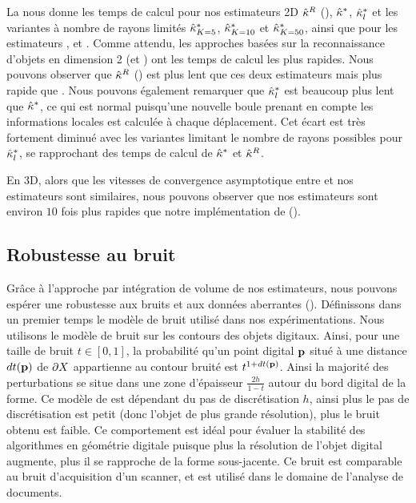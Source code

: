 La  nous donne les temps de calcul pour
nos estimateurs 2D $\hat{\kappa}^{R}$ (\II), $\hat{\kappa}^{*}$, $\hat{\kappa}^{*}_{l}$ et les variantes à
nombre de rayons limités $\hat{\kappa}^{*}_{K=5}$, $\hat{\kappa}^{*}_{K=10}$ et $\hat{\kappa}^{*}_{K=50}$,
ainsi que pour les estimateurs \BC, \MDSS et \MDCA. Comme attendu, les approches
basées sur la reconnaissance d'objets en dimension 2 (\MDSS et \MDCA) ont les
temps de calcul les plus rapides. Nous pouvons observer que $\hat{\kappa}^{R}$ (\II) est
plus lent que ces deux estimateurs mais plus rapide que \BC. Nous pouvons
également remarquer que $\hat{\kappa}^{*}_{l}$ est beaucoup plus lent que $\hat{\kappa}^{*}$, ce qui
est normal puisqu'une nouvelle boule prenant en compte les informations locales
est calculée à chaque déplacement. Cet écart est très fortement diminué avec les
variantes limitant le nombre de rayons possibles pour $\hat{\kappa}^{*}_{l}$, se rapprochant
des temps de calcul de $\hat{\kappa}^{*}$ et $\hat{\kappa}^{R}$.


En 3D, alors que les vitesses de convergence asymptotique entre \JetFitting et
nos estimateurs sont similaires, nous pouvons observer que nos estimateurs sont
environ $10$ fois plus rapides que notre implémentation de \JetFitting (\CGal \cite{CGal}).

\subsection{Robustesse au bruit}
\label{sec:kanungo-noise}

Grâce à l'approche par intégration de volume de nos estimateurs, nous pouvons
espérer une robustesse aux bruits et aux données aberrantes ().
Définissons dans un premier temps le modèle de bruit utilisé dans nos
expérimentations. Nous utilisons le modèle de bruit \Kanungo \cite{Kanungo1996}
sur les contours des objets digitaux. Ainsi, pour une taille de bruit $t \in
[0,1]$, la probabilité qu'un point digital $\mathbf{p}$ situé à une distance $dt(\mathbf{p})$
de $\partial X$ appartienne au contour bruité est $t^{1+dt(\mathbf{p})}$. Ainsi la majorité
des perturbations se situe dans une zone d'épaisseur $\frac{2h}{1-t}$ autour du
bord digital de la forme. Ce modèle de \Kanungo est dépendant du pas de
discrétisation $h$, ainsi plus le pas de discrétisation est petit (donc l'objet
de plus grande résolution), plus le bruit obtenu est faible. Ce comportement est
idéal pour évaluer la stabilité des algorithmes en géométrie digitale
\cite{Kerautret2012} puisque plus la résolution de l'objet digital augmente,
plus il se rapproche de la forme sous-jacente. Ce bruit est comparable au bruit
d'acquisition d'un scanner, et est utilisé dans le domaine de l'analyse de
documents.


